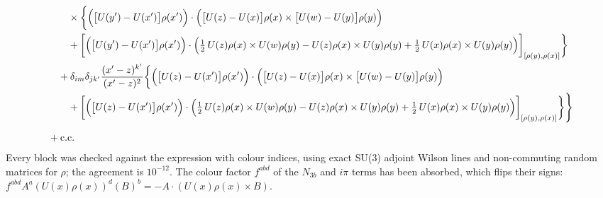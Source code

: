 \documentclass[10pt]{article}
\begin{document}
\begin{align}
&\qquad\times\bigg\{\Big(\big[U(y')-U(x')\big]\rho(x')\Big)\cdot\Big(\big[U(z)-U(x)\big]\rho(x)\times\big[U(w)-U(y)\big]\rho(y)\Big)\notag\\&\qquad+\bigg[\Big(\big[U(y')-U(x')\big]\rho(x')\Big)\cdot\Big(\tfrac12\,U(z)\rho(x)\times U(w)\rho(y)-U(z)\rho(x)\times U(y)\rho(y)+\tfrac12\,U(x)\rho(x)\times U(y)\rho(y)\Big)\bigg]_{[\rho(y),\rho(x)]}\bigg\}\notag\\
&\quad+\delta_{im}\delta_{jk'}\frac{(x'-z)^{k'}}{(x'-z)^{2}}\bigg\{\Big(\big[U(z)-U(x')\big]\rho(x')\Big)\cdot\Big(\big[U(z)-U(x)\big]\rho(x)\times\big[U(w)-U(y)\big]\rho(y)\Big)\notag\\&\qquad+\bigg[\Big(\big[U(z)-U(x')\big]\rho(x')\Big)\cdot\Big(\tfrac12\,U(z)\rho(x)\times U(w)\rho(y)-U(z)\rho(x)\times U(y)\rho(y)+\tfrac12\,U(x)\rho(x)\times U(y)\rho(y)\Big)\bigg]_{[\rho(y),\rho(x)]}\bigg\}\Bigg\}\notag\\[6pt]
&+{\rm c.c.}
\end{align}
\noindent Every block was checked against the expression with colour indices, using exact SU(3) adjoint Wilson lines and non-commuting random matrices for $\rho$; the agreement is $10^{-12}$. The colour factor $f^{abd}$ of the $N_{3b}$ and $i\pi$ terms has been absorbed, which flips their signs: $f^{abd}A^{a}(U(x)\rho(x))^{d}(B)^{b}=-A\cdot(U(x)\rho(x)\times B)$.
\end{document}
